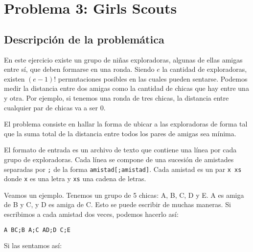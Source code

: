 \section{Problema 3: Girls Scouts}
\subsection{Descripción de la problemática}

En este ejercicio existe un grupo de niñas exploradoras, algunas de ellas amigas entre sí, que deben formarse en una ronda. Siendo $e$ la cantidad de exploradoras, existen $(e-1)!$ permutaciones posibles en las cuales pueden sentarse. Podemos medir la distancia entre dos amigas como la cantidad de chicas que hay entre una y otra. Por ejemplo, si tenemos una ronda de tres chicas, la distancia entre cualquier par de chicas va a ser 0.

El problema consiste en hallar la forma de ubicar a las exploradoras de forma tal que la suma total de la distancia entre todos los pares de amigas sea mínima.

El formato de entrada es un archivo de texto que contiene una línea por cada grupo de exploradoras. Cada línea se compone de una sucesión de amistades separadas por \texttt{;} de la forma \texttt{amistad[;amistad]}. Cada amistad es un par \texttt{x xs} donde \texttt{x} es una letra y \texttt{xs} una cadena de letras.

Veamos un ejemplo. Tenemos un grupo de 5 chicas: A, B, C, D y E. A es amiga de B y C, y D es amiga de C. Esto se puede escribir de muchas maneras. Si escribimos a cada amistad dos veces, podemos hacerlo así:

\texttt{A BC;B A;C AD;D C;E}

Si las sentamos así:


